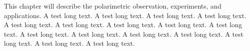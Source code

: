 This chapter will describe the polarimetric observation, experiments, and applications. A test long text. A test long text. A test long text. A test long text. A test long text. A test long text. A test long text. A test long text. A test long text. A test long text. A test long text. A test long text. A test long text. A test long text. A test long text. A test long text. 

\cite{1929PhDT.........9L,1955PhDT........37D,1970GeCAS...1.2127G,1986MNRAS.218...75G}

\citep{2016MNRAS.456..248C}